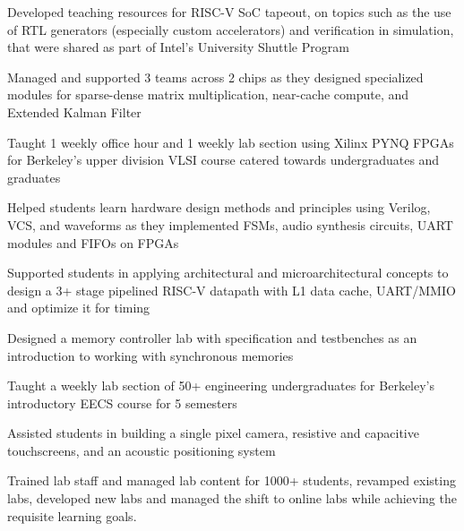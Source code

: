 \documentclass[]{deedy-resume-openfont}
\begin{document}
\vspace{\topsep}
\begin{tightemize}
\item Developed teaching resources for RISC-V SoC tapeout, on topics such as the use of RTL generators (especially custom accelerators) and verification in simulation, that were shared as part of Intel's University Shuttle Program
\item Managed and supported 3 teams across 2 chips as they designed specialized modules for sparse-dense matrix multiplication, near-cache compute, and Extended Kalman Filter
\end{tightemize}
\sectionsep

\vspace{\topsep} %
\begin{tightemize}
\item Taught 1 weekly office hour and 1 weekly lab section using Xilinx PYNQ FPGAs for Berkeley's upper division VLSI course catered towards undergraduates and graduates
\item Helped students learn hardware design methods and principles using Verilog, VCS, and waveforms as they implemented FSMs, audio synthesis circuits, UART modules and FIFOs on FPGAs
\item Supported students in applying architectural and microarchitectural concepts to design a 3+ stage pipelined RISC-V datapath with L1 data cache, UART/MMIO and optimize it for timing
\item Designed a memory controller lab with specification and testbenches as an introduction to working with synchronous memories
\end{tightemize}
\sectionsep

\vspace{\topsep} %
\begin{tightemize}
\item Taught a weekly lab section of 50+ engineering undergraduates for Berkeley's introductory EECS course for 5 semesters
\item Assisted students in building a single pixel camera, resistive and capacitive touchscreens, and an acoustic positioning system
\item Trained lab staff and managed lab content for 1000+ students, revamped existing labs, developed new labs and managed the shift to online labs while achieving the requisite learning goals. 
\end{tightemize}
\sectionsep
\end{document}
